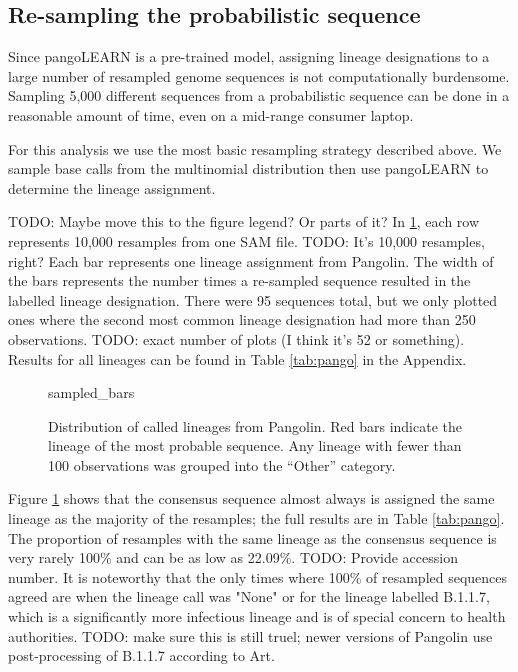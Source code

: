 \documentclass[10pt]{article}
\begin{document}
\subsection{Re-sampling the probabilistic sequence}


Since pangoLEARN is a pre-trained model, assigning lineage designations to a large number of resampled genome sequences is not computationally burdensome.
Sampling 5,000 different sequences from a probabilistic sequence can be done in a reasonable amount of time, even on a mid-range consumer laptop.

For this analysis we use the most basic resampling strategy described above.
We sample base calls from the multinomial distribution then use pangoLEARN to determine the lineage assignment.

TODO: Maybe move this to the figure legend? Or parts of it?
In \ref{fig:covidcalls}, each row represents 10,000 resamples from one SAM file. TODO: It's 10,000 resamples, right?
Each bar represents one lineage assignment from Pangolin.
The width of the bars represents the number times a re-sampled sequence resulted in the labelled lineage designation.
There were 95 sequences total, but we only plotted ones where the second most common lineage designation had more than 250 observations. TODO: exact number of plots (I think it's 52 or something).
Results for all lineages can be found in Table \ref{tab:pango} in the Appendix. 

\begin{figure}
sampled\_bars

\caption{\label{fig:covidcalls}Distribution of called lineages from Pangolin. Red bars indicate the lineage of the most probable sequence. Any lineage with fewer than 100 observations was grouped into the ``Other'' category.}
\end{figure}


Figure \ref{fig:covidcalls} shows that the consensus sequence almost always is assigned the same lineage as the majority of the resamples; the full results are in Table \ref{tab:pango}.
The proportion of resamples with the same lineage as the consensus sequence is very rarely 100\% and can be as low as 22.09\%. TODO: Provide accession number.
It is noteworthy that the only times where 100\% of resampled sequences agreed are when the lineage call was "None" or for the lineage labelled B.1.1.7, which is a significantly more infectious lineage and is of special concern to health authorities. TODO: make sure this is still truel; newer versions of Pangolin use post-processing of B.1.1.7 according to Art.
\end{document}
